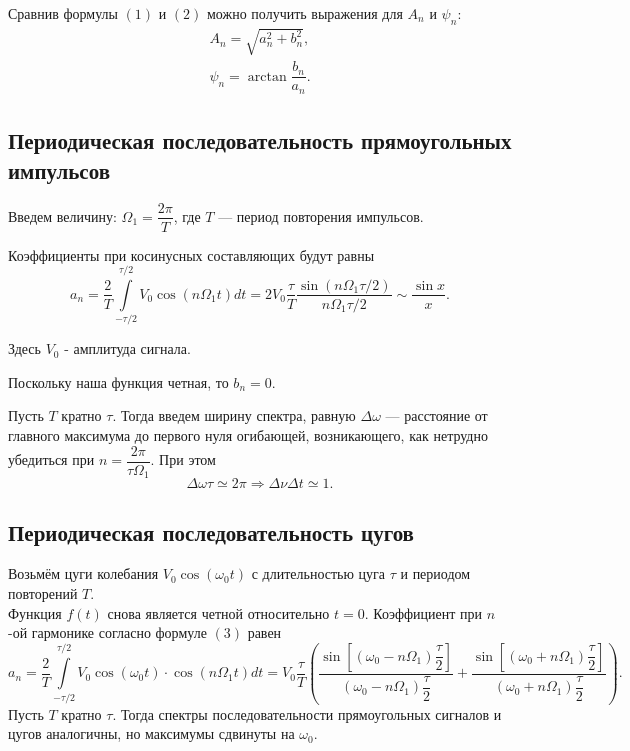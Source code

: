 \documentclass[a4paper, 12pt]{article}%
\begin{document}
	Сравнив формулы $(1)$ и $(2)$ можно получить выражения для $A_n$  и $\psi_n$:
	\begin{equation}
		\begin{array}{l}
			A_n = \sqrt{a_n^2+b_n^2},\\
			\psi_n = \arctan \dfrac{b_n}{a_n}.
		\end{array}
	\end{equation}
	\subsection*{Периодическая последовательность прямоугольных импульсов}
	Введем величину: $\Omega_1 = \dfrac{2\pi}{T}$,
	где $T$ --- период повторения импульсов.
	
	Коэффициенты при косинусных составляющих будут равны
	\begin{equation}
		a_n = \dfrac{2}{T}\int\limits_{-\tau/2}^{\tau/2}V_0\cos\left(n\Omega_1 t\right)dt = 2V_0\dfrac{\tau}{T}\dfrac{\sin\left(n\Omega_1\tau/2\right)}{n\Omega_1\tau/2} \sim \dfrac{\sin x}{x}.
	\end{equation}
	
	Здесь $V_0$ - амплитуда сигнала.
	
	Поскольку наша функция четная, то $b_n = 0$. 
	
	Пусть $T$ кратно $\tau$. Тогда введем ширину спектра, равную $\Delta \omega$ --- расстояние от главного максимума до первого нуля огибающей, возникающего, как нетрудно убедиться при $n = \dfrac{2\pi}{\tau \Omega_1}$. При 
	этом
	\begin{equation}
		\Delta \omega \tau \simeq 2\pi \Rightarrow \Delta \nu \Delta t \simeq 1.
	\end{equation}
	\subsection*{Периодическая последовательность цугов}
	Возьмём цуги колебания $V_0 \cos(\omega_0 t)$ с длительностью цуга $\tau$ и периодом повторений $T$.\\
	Функция $f(t)$ снова является четной относительно $t = 0$. Коэффициент при $n$-ой гармонике согласно формуле $(3)$ равен
	\begin{equation}
		a_n = \dfrac{2}{T}\int\limits_{-\tau/2}^{\tau/2}V_0 \cos \left(\omega_0t\right) \cdot \cos\left(n \Omega_1t\right)dt = V_0 \dfrac{\tau}{T}\left( \dfrac{\sin\left[\left(\omega_0 - n \Omega_1\right)\dfrac{\tau}{2}\right]}{\left( \omega_0 - n \Omega_1\right) \dfrac{\tau}{2}} + \dfrac{\sin\left[\left(\omega_0 + n \Omega_1\right)\dfrac{\tau}{2}\right]}{\left( \omega_0 + n \Omega_1\right) \dfrac{\tau}{2}}\right).
	\end{equation}
	Пусть $T$ кратно $\tau$. Тогда спектры последовательности прямоугольных сигналов и цугов аналогичны, но максимумы сдвинуты на $\omega_0$.
\end{document}
